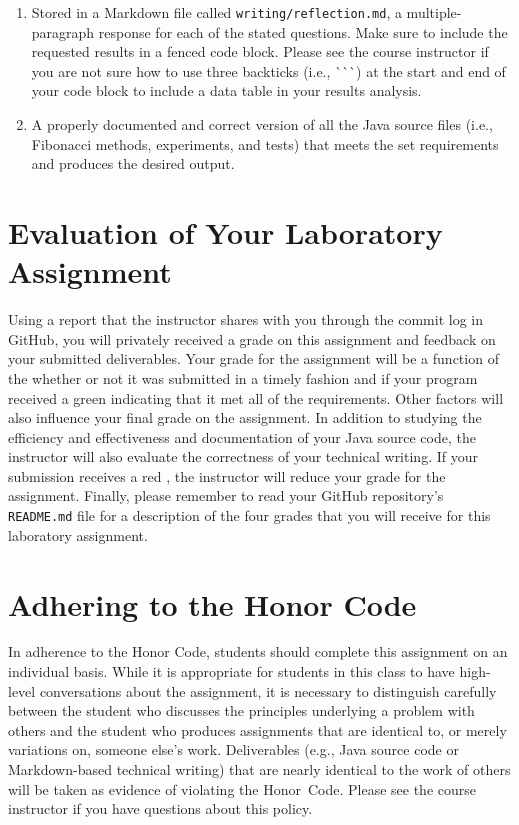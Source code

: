 \documentclass[11pt]{article}
\newcommand{\reflection}{\lstinline{writing/reflection.md}}
\newcommand{\backticktrick}{\`{}\`{}\`{}}
\newcommand{\program}[1]{\lstinline{#1}}
\newcommand{\checkmark}{\ding{51}}
\newcommand{\naughtmark}{\ding{55}}
\begin{document}
\begin{enumerate}

  \setlength{\itemsep}{0in}

\item Stored in a Markdown file called \reflection{}, a multiple-paragraph
  response for each of the stated questions. Make sure to include the requested
  results in a fenced code block. Please see the course instructor if you are
  not sure how to use three backticks (i.e., \backticktrick{}) at the start and
  end of your code block to include a data table in your results analysis.

\item A properly documented and correct version of all the Java source files
  (i.e., Fibonacci methods, experiments, and tests) that meets the set
  requirements and produces the desired output.

\end{enumerate}

\section*{Evaluation of Your Laboratory Assignment}

Using a report that the instructor shares with you through the commit log in
GitHub, you will privately received a grade on this assignment and feedback on
your submitted deliverables. Your grade for the assignment will be a function of
the whether or not it was submitted in a timely fashion and if your program
received a green \checkmark{} indicating that it met all of the requirements.
Other factors will also influence your final grade on the assignment. In
addition to studying the efficiency and effectiveness and documentation of your
Java source code, the instructor will also evaluate the correctness of your
technical writing. If your submission receives a red \naughtmark{}, the
instructor will reduce your grade for the assignment. Finally, please remember
to read your GitHub repository's \program{README.md} file for a description of
the four grades that you will receive for this laboratory assignment.

\section*{Adhering to the Honor Code}

In adherence to the Honor Code, students should complete this assignment on an
individual basis. While it is appropriate for students in this class to have
high-level conversations about the assignment, it is necessary to distinguish
carefully between the student who discusses the principles underlying a problem
with others and the student who produces assignments that are identical to, or
merely variations on, someone else's work. Deliverables (e.g., Java source code
or Markdown-based technical writing) that are nearly identical to the work of
others will be taken as evidence of violating the \mbox{Honor Code}. Please see
the course instructor if you have questions about this policy.
\end{document}
